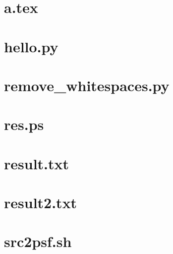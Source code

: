 \documentclass{article}
\begin{document}
\tableofcontents

\newpage
\section{a.tex}

\newpage
\section{hello.py}

\newpage
\section{remove_whitespaces.py}

\newpage
\section{res.ps}

\newpage
\section{result.txt}

\newpage
\section{result2.txt}

\newpage
\section{src2psf.sh}

\end{document}
